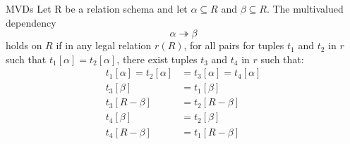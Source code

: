 \documentclass[aspectratio=169]{beamer}
\begin{document}

\begin{frame}{MVDs}
    Let R be a relation schema and let $\alpha \subseteq R$ and $\beta \subseteq R$. The multivalued dependency
        $$
            \alpha \twoheadrightarrow \beta
        $$
    holds on $R$ if in any legal relation $r(R)$, for all pairs for tuples $t_1$ and $t_2$ in $r$ such that $t_1[\alpha] = t_2[\alpha]$, there exist tuples $t_3$ and $t_4$ in $r$ such that:
        \begin{equation*}
            \begin{align*}
                t_1[\alpha] = t_2[\alpha] &= t_3[\alpha] = t_4[\alpha] \\
                t_3[\beta] &= t_1[\beta] \\
                t_3[R - \beta] &= t_2[R - \beta] \\
                t_4[\beta] &= t_2[\beta] \\
                t_4[R - \beta] &= t_1[R - \beta] \\
            \end{align*}
        \end{equation*}
\end{frame}
\end{document}

